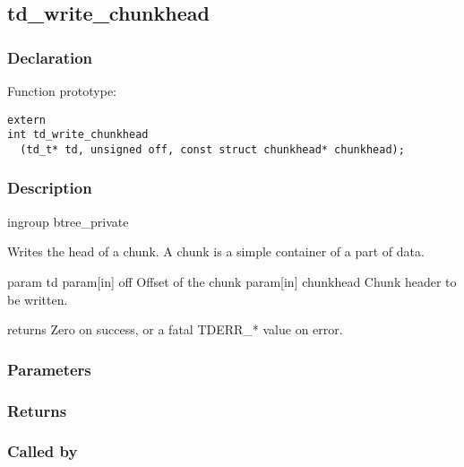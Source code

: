 
\newpage
\subsection{td\_write\_chunkhead}
\subsubsection{Declaration} Function prototype:

\begin{verbatim}
extern
int td_write_chunkhead
  (td_t* td, unsigned off, const struct chunkhead* chunkhead);
\end{verbatim}

\subsubsection{Description}


 ingroup btree\_private

 Writes the head of a chunk. A chunk is a simple container of a part
 of data.

 param td
 param[in] off Offset of the chunk
 param[in] chunkhead Chunk header to be written.

 returns Zero on success, or a fatal TDERR\_* value on error.
 

\subsubsection{Parameters}
\subsubsection{Returns}
\subsubsection{Called by}
